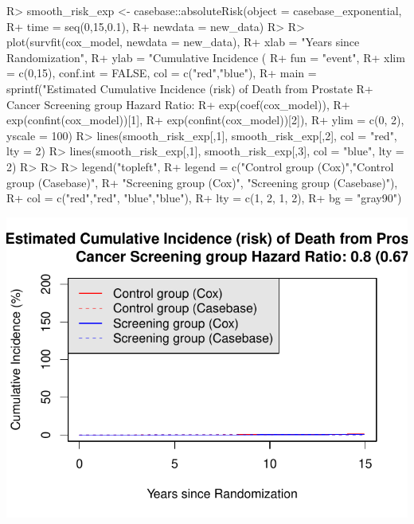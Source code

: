 \documentclass[
]{jss}
\begin{document}
\begin{CodeChunk}

\begin{CodeInput}
R> smooth_risk_exp <- casebase::absoluteRisk(object = casebase_exponential, 
R+                                           time = seq(0,15,0.1), 
R+                                           newdata = new_data)
R> 
R> plot(survfit(cox_model, newdata = new_data),
R+      xlab = "Years since Randomization", 
R+      ylab = "Cumulative Incidence (%
R+      fun = "event",
R+      xlim = c(0,15), conf.int = FALSE, col = c("red","blue"), 
R+      main = sprintf("Estimated Cumulative Incidence (risk) of Death from Prostate 
R+                     Cancer Screening group Hazard Ratio: %
R+                     exp(coef(cox_model)), 
R+                     exp(confint(cox_model))[1], 
R+                     exp(confint(cox_model))[2]),
R+      ylim = c(0, 2), yscale = 100)
R> lines(smooth_risk_exp[,1], smooth_risk_exp[,2], col = "red", lty = 2)
R> lines(smooth_risk_exp[,1], smooth_risk_exp[,3], col = "blue", lty = 2)
R> 
R> 
R> legend("topleft", 
R+        legend = c("Control group (Cox)","Control group (Casebase)",
R+                   "Screening group (Cox)", "Screening group (Casebase)"), 
R+        col = c("red","red", "blue","blue"),
R+        lty = c(1, 2, 1, 2), 
R+        bg = "gray90")
\end{CodeInput}


\begin{center}\includegraphics{../figures/erspc-casebase-cif-1} \end{center}

\end{CodeChunk}
\end{document}
